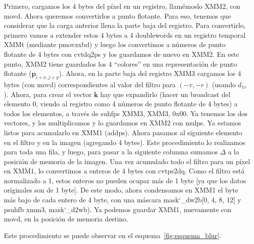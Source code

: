 Primero, cargamos los 4 bytes del píxel en un registro, llamémoslo
{\ttfamily XMM2}, con {\ttfamily movd}. Ahora queremos convertirlos a
punto flotante. Para eso, tenemos que considerar que la carga anterior
llena la parte baja del registro. Para convertirlo, primero vamos a
extender estos 4 bytes a 4 doublewords en un registro temporal
{\ttfamily XMMt} (mediante {\ttfamily pmovzxbd}) y luego los
convertimos a números de punto flotante de 4 bytes con {\ttfamily
  cvtdq2ps} y los guardamos de nuevo en {\ttfamily XMM2}. En este
punto, {\ttfamily XMM2} tiene guardados los 4 ``colores'' en una
representación de punto flotante ($\mathbf{p}_{i+x, j+y}$). Ahora, en
la parte baja del registro {\ttfamily XMM3} cargamos los 4 bytes (con
{\ttfamily movd}) correspondientes al valor del filtro para $(-r, -r)$
(usando $d_{1v}$). Ahora, para crear el vector $\mathbf{k}$ hay que
expandirlo (hacer un broadcast del elemento 0, viendo al registro como
4 números de punto flotante de 4 bytes) a todos los elementos, a
través de {\ttfamily suhfps XMM3, XMM3, 0x00}. Ya tenemos los dos
vectores, y los multiplicamos y lo guardamos en {\ttfamily XMM2} con
{\ttfamily mulps}. Ya estamos listos para acumularlo en {\ttfamily
  XMM1} ({\ttfamily addps}). Ahora pasamos al siguiente elemento en el
filtro y en la imagen (agregando 4 bytes). Este procedimiento lo
realizamos para toda una fila, y luego, para pasar a la siguiente
columna sumamos $\Delta$ a la posición de memoria de la imagen. Una
vez acumulado todo el filtro para un píxel en {\ttfamily XMM1}, lo
convertimos a enteros de 4 bytes con {\ttfamily cvtps2dq}. Como el
filtro está normalizado a 1, estos enteros no pueden ocupar más de 1
byte [ya que los datos originales son de 1 byte]. De este modo, ahora
condensamos en {\ttfamily XMM1} el byte más bajo de cada entero de 4
byte, con una máscara mask\char`_dw2b[0, 4, 8, 12] y {\ttfamily psuhfb
  xmm3, mask\char`_d2wb}). Ya podemos guardar {\ttfamily XMM1},
nuevamente con {\ttfamily movd}, en la posición de memoria destino.

Este procedimiento se puede observar en el
esquema~\ref{fig:esquema_blur}.

